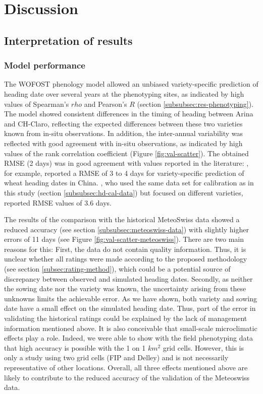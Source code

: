 \section{Discussion}
\label{sec:hd-discussion}
\subsection{Interpretation of results}
\subsubsection{Model performance}
The \gls{WOFOST} phenology model allowed an unbiased variety-specific prediction of heading date over several years at the phenotyping sites, as indicated by high values of Spearman's $rho$ and Pearson's $R$ (section \ref{subsubsec:res-phenotyping}). The model showed consistent differences in the timing of heading between Arina and CH-Claro, reflecting the expected differences between these two varieties known from in-situ observations. In addition, the inter-annual variability was reflected with good agreement with in-situ observations, as indicated by high values of the rank correlation coefficient (Figure \ref{fig:val-scatter}). The obtained \gls{RMSE} (2 days) was in good agreement with values reported in the literature: \cite{liu_uncertainty_2018}, for example, reported a \gls{RMSE} of 3 to 4 days for variety-specific prediction of wheat heading dates in China. \cite{rogger_can_2021}, who used the same data set for calibration as in this study (section \ref{subsubsec:hd-cal-data}) but focused on different varieties, reported \gls{RMSE} values of 3.6 days.

The results of the comparison with the historical MeteoSwiss data showed a reduced accuracy (see section \ref{subsubsec:meteoswiss-data}) with slightly higher errors of 11 days (see Figure \ref{fig:val-scatter-meteoswiss}). There are two main reasons for this: First, the data do not contain quality information. Thus, it is unclear whether all ratings were made according to the proposed methodology (see section \ref{subsec:rating-method}), which could be a potential source of discrepancy between observed and simulated heading dates. Secondly, as neither the sowing date nor the variety was known, the uncertainty arising from these unknowns limits the achievable error. As we have shown, both variety and sowing date have a small effect on the simulated heading date. Thus, part of the error in validating the historical ratings could be explained by the lack of management information mentioned above. It is also conceivable that small-scale microclimatic effects play a role. Indeed, we were able to show with the field phenotyping data that high accuracy is possible with the 1 on 1 $km^2$ grid cells. However, this is only a study using two grid cells (FIP and Delley) and is not necessarily representative of other locations. Overall, all three effects mentioned above are likely to contribute to the reduced accuracy of the validation of the Meteoswiss data.

